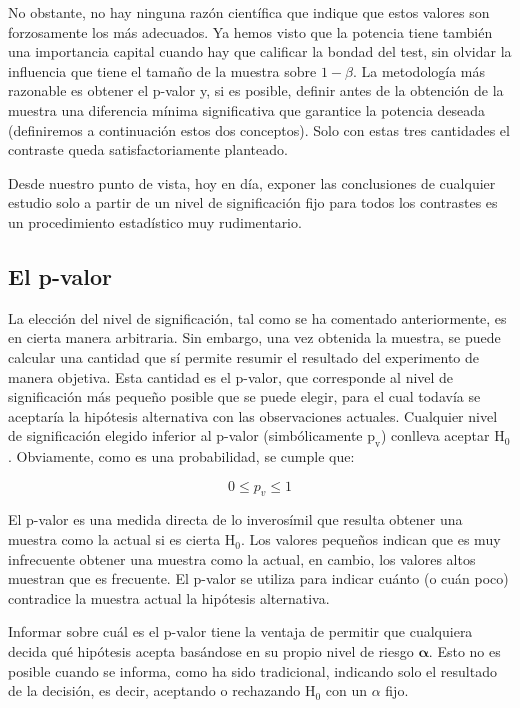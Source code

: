 \documentclass[
]{article}
\begin{document}
No obstante, no hay ninguna razón científica que indique que estos valores son forzosamente los más adecuados. Ya hemos visto que la potencia tiene también una importancia capital cuando hay que calificar la bondad del test, sin olvidar la influencia que tiene el tamaño de la muestra sobre \(1-\beta\). La metodología más razonable es obtener el p-valor y, si es posible, definir antes de la obtención de la muestra una diferencia mínima significativa que garantice la potencia deseada (definiremos a continuación estos dos conceptos). Solo con estas tres cantidades el contraste queda satisfactoriamente planteado.

Desde nuestro punto de vista, hoy en día, exponer las conclusiones de cualquier estudio solo a partir de un nivel de significación fijo para todos los contrastes es un procedimiento estadístico muy rudimentario.

\subsection{El p-valor}\label{el-p-valor}

La elección del nivel de significación, tal como se ha comentado anteriormente, es en cierta manera arbitraria. Sin embargo, una vez obtenida la muestra, se puede calcular una cantidad que sí permite resumir el resultado del experimento de manera objetiva. Esta cantidad es el p-valor, que corresponde al nivel de significación más pequeño posible que se puede elegir, para el cual todavía se aceptaría la hipótesis alternativa con las observaciones actuales. Cualquier nivel de significación elegido inferior al p-valor (simbólicamente \(\mathrm{p}_{\mathrm{v}}\)) conlleva aceptar \(\mathrm{H}_{0}\). Obviamente, como es una probabilidad, se cumple que:

\[
0 \leq p_{v} \leq 1
\]

El p-valor es una medida directa de lo inverosímil que resulta obtener una muestra como la actual si es cierta \(\mathrm{H}_{0}\). Los valores pequeños indican que es muy infrecuente obtener una muestra como la actual, en cambio, los valores altos muestran que es frecuente. El p-valor se utiliza para indicar cuánto (o cuán poco) contradice la muestra actual la hipótesis alternativa.

Informar sobre cuál es el p-valor tiene la ventaja de permitir que cualquiera decida qué hipótesis acepta basándose en su propio nivel de riesgo \(\boldsymbol{\alpha}\). Esto no es posible cuando se informa, como ha sido tradicional, indicando solo el resultado de la decisión, es decir, aceptando o rechazando \(\mathrm{H}_{0}\) con un \(\alpha\) fijo.
\end{document}
